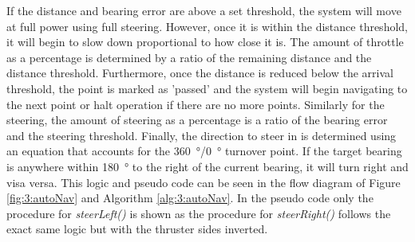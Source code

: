 If the distance and bearing error are above a set threshold, the system will move at full power using full steering. However, once it is within the distance threshold, it will begin to slow down proportional to how close it is. The amount of throttle as a percentage is determined by a ratio of the remaining distance and the distance threshold. Furthermore, once the distance is reduced below the arrival threshold, the point is marked as 'passed' and the system will begin navigating to the next point or halt operation if there are no more points. Similarly for the steering, the amount of steering as a percentage is a ratio of the bearing error and the steering threshold. Finally, the direction to steer in is determined using an equation that accounts for the \SI{360}{\degree}/\SI{0}{\degree} turnover point. If the target bearing is anywhere within \SI{180}{\degree} to the right of the current bearing, it will turn right and visa versa. This logic and pseudo code can be seen in the flow diagram of Figure \ref{fig:3:autoNav} and Algorithm \ref{alg:3:autoNav}. In the pseudo code only the procedure for \emph{steerLeft()} is shown as the procedure for \emph{steerRight()} follows the exact same logic but with the thruster sides inverted. 

